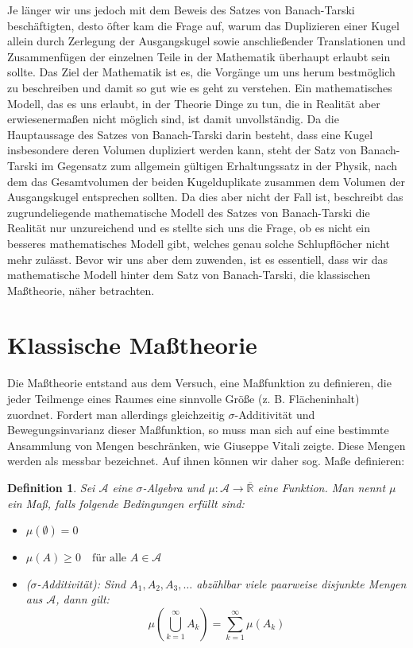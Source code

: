 \documentclass{article}
\newtheorem{definition}[satz]{Definition}
\begin{document}
\noindent Je länger wir uns jedoch mit dem Beweis des Satzes von Banach-Tarski beschäftigten, desto öfter kam die Frage auf, warum das Duplizieren einer Kugel allein durch Zerlegung der Ausgangskugel sowie anschließender Translationen und Zusammenfügen der einzelnen Teile in der Mathematik überhaupt erlaubt sein sollte. Das Ziel der Mathematik ist es, die Vorgänge um uns herum bestmöglich zu beschreiben und damit so gut wie es geht zu verstehen. Ein mathematisches Modell, das es uns erlaubt, in der Theorie Dinge zu tun, die in Realität aber erwiesenermaßen nicht möglich sind, ist damit unvollständig. Da die Hauptaussage des Satzes von Banach-Tarski darin besteht, dass eine Kugel insbesondere deren Volumen dupliziert werden kann, steht der Satz von Banach-Tarski im Gegensatz zum allgemein gültigen Erhaltungssatz in der Physik, nach dem das Gesamtvolumen der beiden Kugelduplikate zusammen dem Volumen der Ausgangskugel entsprechen sollten. Da dies aber nicht der Fall ist, beschreibt das zugrundeliegende mathematische Modell des Satzes von Banach-Tarski die Realität nur unzureichend und es stellte sich uns die Frage, ob es nicht ein besseres mathematisches Modell gibt, welches genau solche Schlupflöcher nicht mehr zulässt. Bevor wir uns aber dem zuwenden, ist es essentiell, dass wir das mathematische Modell hinter dem Satz von Banach-Tarski, die klassischen Maßtheorie, näher betrachten.         


\section{Klassische Maßtheorie}
Die Maßtheorie \autocite{wiki_Maßtheorie} entstand aus dem Versuch, eine Maßfunktion zu definieren, die jeder Teilmenge eines Raumes eine sinnvolle Größe (z. B. Flächeninhalt) zuordnet. Fordert man allerdings gleichzeitig $\sigma$-Additivität und Bewegungsinvarianz dieser Maßfunktion, so muss man sich auf eine bestimmte Ansammlung von Mengen beschränken, wie Giuseppe Vitali zeigte. Diese Mengen werden als messbar bezeichnet. Auf ihnen können wir daher sog. Maße definieren:

\begin{definition}
Sei $\mathcal{A}$ eine $\sigma$-Algebra und $\mu:\mathcal{A} \to \overline{\mathbb{R}}$
eine Funktion. Man nennt $\mu$ ein Maß, falls folgende Bedingungen erfüllt sind:
\begin{itemize}
\item $\mu(\emptyset) = 0$

\item $\mu(A) \geq 0 \quad \text{für alle } A \in \mathcal{A}$

\item ($\sigma$-Additivität): Sind 
$A_1, A_2, A_3, \dotsc$ abzählbar viele paarweise disjunkte Mengen aus $\mathcal{A}$, dann gilt:
$$\mu\left(\bigcup_{k=1}^\infty A_k\right) = \sum_{k=1}^\infty \mu(A_k)$$
\end{itemize}
\end{definition}
\end{document}
